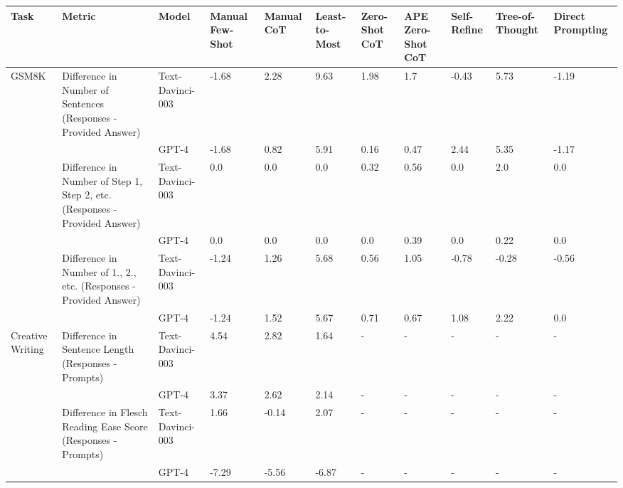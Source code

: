\begin{tabular}{x{0.75cm}|x{1.5cm}|x{0.75cm}|x{0.75cm}|x{0.75cm}|x{0.75cm}|x{0.75cm}|x{0.75cm}|x{0.75cm}|x{0.75cm}|x{0.75cm}}
\toprule
\hline
Task & Metric & Model & Manual Few-Shot & Manual CoT & Least-to-Most & Zero-Shot CoT & APE Zero-Shot CoT & Self-Refine & Tree-of-Thought & Direct Prompting \\
\hline
\midrule
GSM8K & Difference in Number of Sentences (Responses - Provided Answer) & Text-Davinci-003 & -1.68 & 2.28 & 9.63 & 1.98 & 1.7 & -0.43 & 5.73 & -1.19 \\
\hline
 &  & GPT-4 & -1.68 & 0.82 & 5.91 & 0.16 & 0.47 & 2.44 & 5.35 & -1.17 \\
\hline
 & Difference in Number of Step 1, Step 2, etc. (Responses - Provided Answer) & Text-Davinci-003 & 0.0 & 0.0 & 0.0 & 0.32 & 0.56 & 0.0 & 2.0 & 0.0 \\
\hline
 &  & GPT-4 & 0.0 & 0.0 & 0.0 & 0.0 & 0.39 & 0.0 & 0.22 & 0.0 \\
\hline
 & Difference in Number of 1., 2., etc. (Responses - Provided Answer) & Text-Davinci-003 & -1.24 & 1.26 & 5.68 & 0.56 & 1.05 & -0.78 & -0.28 & -0.56 \\
\hline
 &  & GPT-4 & -1.24 & 1.52 & 5.67 & 0.71 & 0.67 & 1.08 & 2.22 & 0.0 \\
\hline
Creative Writing & Difference in Sentence Length (Responses - Prompts) & Text-Davinci-003 & 4.54 & 2.82 & 1.64 & - & - & - & - & - \\
\hline
 &  & GPT-4 & 3.37 & 2.62 & 2.14 & - & - & - & - & - \\
\hline
 & Difference in Flesch Reading Ease Score (Responses - Prompts) & Text-Davinci-003 & 1.66 & -0.14 & 2.07 & - & - & - & - & - \\
\hline
 &  & GPT-4 & -7.29 & -5.56 & -6.87 & - & - & - & - & - \\
\hline
\bottomrule
\end{tabular}
